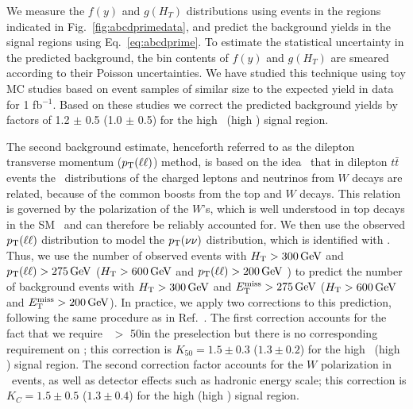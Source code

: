We measure the $f(y)$ and $g(H_T)$ distributions using events in the regions indicated in Fig.~\ref{fig:abcdprimedata},
and predict the background yields in the signal regions using Eq.~\ref{eq:abcdprime}.
To estimate the statistical uncertainty in the predicted background,  the bin contents
of $f(y)$ and $g(H_T)$ are smeared according to their Poisson uncertainties. 
We have studied this technique using toy MC studies based on
event samples of similar size to the expected yield in data for 1 fb$^{-1}$.
Based on these studies we correct the predicted background yields by factors of 1.2 $\pm$ 0.5
(1.0 $\pm$ 0.5) for the high \MET\ (high \Ht) signal region.


The second  background estimate, henceforth referred to as the dilepton transverse momentum ($p_{\mathrm{T}}(\ell\ell)$) method, 
is  based on the  idea~\cite{ref:victory} that  in dilepton  $t\bar{t}$  events the
\pt\  distributions of  the charged  leptons and  neutrinos  from $W$
decays are  related, because of the  common boosts from  the top  and $W$
decays.  This relation  is governed by the polarization  of the $W$'s,
which         is         well         understood        in         top
decays in the SM~\cite{Wpolarization,Wpolarization2}   and   can  therefore   be
reliably  accounted   for.   We then  use   the  observed
$p_{\mathrm{T}}(\ell\ell)$ distribution to  model the $p_{\mathrm{T}}(\nu\nu)$ distribution,
which is  identified with \MET.  Thus,  we use the  number of observed
events  with $H_{\mathrm{T}} > 300\,\text{Ge\hspace{-.08em}V}$ and $p_{\mathrm{T}}(\ell\ell)  > 275\,\text{Ge\hspace{-.08em}V}$ 
($H_{\mathrm{T}} > 600\,\text{Ge\hspace{-.08em}V}$ and $p_{\mathrm{T}}(\ell\ell)  > 200\,\text{Ge\hspace{-.08em}V}$ )
to predict the  number of  background events  with 
$H_{\mathrm{T}} >  300\,\text{Ge\hspace{-.08em}V}$ and  $E_{\mathrm{T}}^{\text{miss}} > 275\,\text{Ge\hspace{-.08em}V}$ ($H_{\mathrm{T}} >  600\,\text{Ge\hspace{-.08em}V}$ and  $E_{\mathrm{T}}^{\text{miss}} > 200\,\text{Ge\hspace{-.08em}V}$).  
In  practice, we apply two corrections to this prediction, following the same procedure as in Ref.~\cite{ref:ospaper}.
The first correction accounts for the fact that we require \met\ $>$ 50\GeV in the preselection
but there is no corresponding requirement on \ptll; this correction
is $K_{50}=1.5 \pm 0.3$ ($1.3 \pm 0.2$) for the high \MET\ (high \Ht) signal region.
The  second correction factor accounts for the $W$ polarization in \ttbar\ events, as well
as detector effects such as hadronic energy scale; this correction is $K_C  = 1.5  \pm 0.5$ ($1.3 \pm 0.4$) for the
high \MET (high \Ht) signal region.


